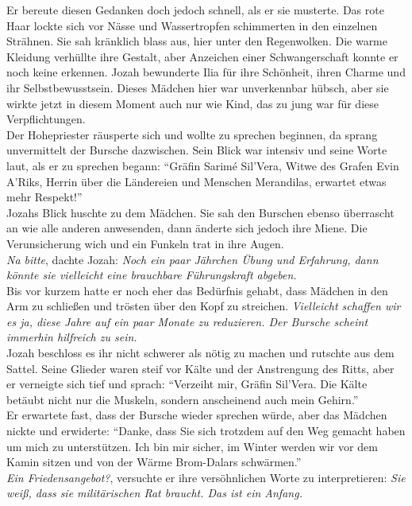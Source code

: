 Er bereute diesen Gedanken doch jedoch schnell, als er sie musterte. Das rote Haar lockte sich 
vor Nässe und Wassertropfen schimmerten in den einzelnen Strähnen. Sie sah kränklich blass aus, 
hier unter den Regenwolken. Die warme Kleidung verhüllte ihre Gestalt, aber Anzeichen einer 
Schwangerschaft konnte er noch keine erkennen. Jozah bewunderte Ilia für ihre Schönheit, ihren 
Charme und ihr Selbstbewusstsein. Dieses Mädchen hier war unverkennbar hübsch, aber sie wirkte 
jetzt in diesem Moment auch nur wie Kind, das zu jung war für diese Verpflichtungen.\\
Der Hohepriester räusperte sich und wollte zu sprechen beginnen, da sprang unvermittelt der Bursche 
dazwischen. Sein Blick war intensiv und seine Worte laut, als er zu sprechen begann: ``Gräfin 
Sarimé Sil'Vera, Witwe des Grafen Evin A'Riks, Herrin über die Ländereien und Menschen Merandilas, 
erwartet etwas mehr Respekt!''\\
Jozahs Blick huschte zu dem Mädchen. Sie sah den Burschen ebenso überrascht an wie alle anderen 
anwesenden, dann änderte sich jedoch ihre Miene. Die Verunsicherung wich und ein Funkeln trat in 
ihre Augen.\\
\textit{Na bitte}, dachte Jozah: \textit{Noch ein paar Jährchen Übung und Erfahrung, dann könnte 
sie vielleicht eine brauchbare Führungskraft abgeben.}\\
Bis vor kurzem hatte er noch eher das Bedürfnis gehabt, dass Mädchen in den Arm zu schließen und 
trösten über den Kopf zu streichen. \textit{Vielleicht schaffen wir es ja, diese Jahre auf ein paar 
Monate zu reduzieren. Der Bursche scheint immerhin hilfreich zu sein.}\\
Jozah beschloss es ihr nicht schwerer als nötig zu machen und rutschte aus dem Sattel. Seine 
Glieder waren steif vor Kälte und der Anstrengung des Ritts, aber er verneigte sich tief und 
sprach: ``Verzeiht mir, Gräfin Sil'Vera. Die Kälte betäubt nicht nur die Muskeln, sondern 
anscheinend auch mein Gehirn.''\\
Er erwartete fast, dass der Bursche wieder sprechen würde, aber das Mädchen nickte und erwiderte: 
``Danke, dass Sie sich trotzdem auf den Weg gemacht haben um mich zu unterstützen. Ich bin mir 
sicher, im Winter werden wir vor dem Kamin sitzen und von der Wärme Brom-Dalars schwärmen.''\\
\textit{Ein Friedensangebot?}, versuchte er ihre versöhnlichen Worte zu interpretieren: \textit{Sie 
weiß, dass sie militärischen Rat braucht. Das ist ein Anfang.}\\
